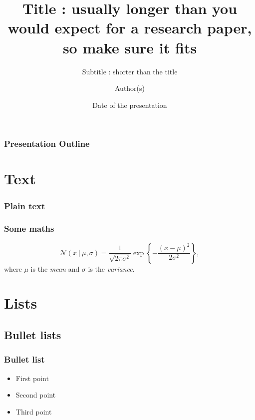 \documentclass[
	11pt, %
	aspectratio=169, %
]{beamer}
\title{Title : usually longer than you would expect for a research paper, so make sure it fits}
\subtitle{Subtitle : shorter than the title}
\author{Author(s)}
\institute{ARAMIS Lab}
\date{Date of the presentation}
\begin{document}

\begin{frame}[plain, label=titlepage]
	\titlepage %
\end{frame}


\begin{frame}
	\frametitle{Presentation Outline} %
	\tableofcontents[hideallsubsections] %
\end{frame}


\section{Text}

\begin{frame}
  \frametitle{Plain text}

  \lipsum[1][1-5]
  \vfill
  \lipsum[2][1-5]
  \vfill
  \lipsum[3][1-5]

\end{frame}

\begin{frame}
  \frametitle{Some maths}

  \lipsum[4][1-5]
  \[\mathcal{N}(x~|~\mu, \sigma) = \frac{1}{\sqrt{2\pi\sigma^2}}\exp\left\{-\frac{(x-\mu)^2}{2\sigma^2}\right\},\]
  where $\mu$ is the \emph{mean} and $\sigma$ is the \emph{variance}.

\end{frame}

\section{Lists}

\subsection{Bullet lists}
\begin{frame}
  \frametitle{Bullet list}

  \begin{itemize}
    \item First point
    \item Second point
    \item Third point
  \end{itemize}

\end{frame}
\end{document}

